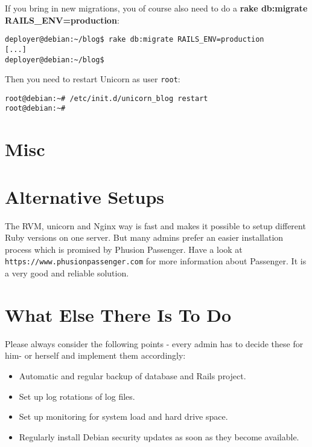 \documentclass[a4paper]{book}
\newcounter{tab}[chapter]
\begin{document}
If you bring in new migrations, you of course also need to do a \textbf{rake db:migrate RAILS\_ENV=production}:

\begin{shaded}\begin{verbatim}
deployer@debian:~/blog$ rake db:migrate RAILS_ENV=production
[...]
deployer@debian:~/blog$
\end{verbatim}\end{shaded}

Then you need to restart Unicorn as user \texttt{root}:

\begin{shaded}\begin{verbatim}
root@debian:~# /etc/init.d/unicorn_blog restart
root@debian:~#
\end{verbatim}\end{shaded}

\section{Misc}\label{misc-1}

\section{Alternative Setups}\label{alternative-setups}

The RVM, unicorn and Nginx way is fast and makes it possible to setup different Ruby versions on one server. But many admins prefer an easier installation process which is promised by Phusion Passenger. Have a look at \texttt{https://www.phusionpassenger.com} for more information about Passenger. It is a very good and reliable solution.

\section{What Else There Is To Do}\label{what-else-there-is-to-do}

Please always consider the following points - every admin has to decide these for him- or herself and implement them accordingly:

\begin{itemize}
\itemsep1pt\parskip0pt
\item
  Automatic and regular backup of database and Rails project.
\item
  Set up log rotations of log files.
\item
  Set up monitoring for system load and hard drive space.
\item
  Regularly install Debian security updates as soon as they become available.
\end{itemize}
\end{document}
